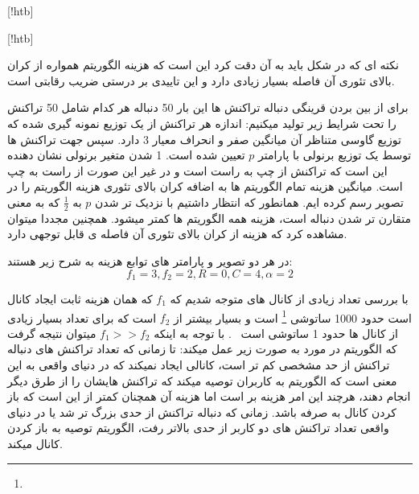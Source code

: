 [!htb]

[!htb]

نکته ای که در شکل   باید به آن دقت کرد این است که هزینه الگوریتم \on همواره از کران بالای تئوری آن فاصله بسیار زیادی دارد و این تاییدی بر درستی ضریب رقابتی است.

برای از بین بردن قرینگی دنباله تراکنش ها این بار 50 دنباله هر کدام شامل 50 تراکنش را تحت شرایط زیر تولید میکنیم: اندازه هر تراکنش از یک توزیع  نمونه گیری شده که توزیع گاوسی متناظر آن میانگین صفر و انحراف معیار 3 دارد. سپس جهت تراکنش ها توسط یک توزیع برنولی با پارامتر $p$ تعیین شده است. 1 شدن متغیر برنولی نشان دهنده این است که تراکنش از چپ به راست است و در غیر این صورت از راست به چپ است. میانگین هزینه تمام الگوریتم ها به اضافه کران بالای تئوری هزینه الگوریتم \on را در تصویر  رسم کرده ایم.
همانطور که انتظار داشتیم با نزدیک تر شدن $p$  به 
$\frac12$
که به معنی متقارن تر شدن دنباله است، هزینه همه الگوریتم ها کمتر میشود. همچنین مجددا میتوان مشاهده کرد که هزینه \on از کران بالای تئوری آن فاصله ی قابل توجهی دارد. 

در هر دو تصویر  و  پارامتر های توابع هزینه به شرح زیر هستند:
$$f_1 = 3 , f_2 = 2 , R = 0 , C = 4 , \alpha=2$$




با بررسی تعداد زیادی از کانال های   متوجه شدیم که 
$f_1$
که همان هزینه ثابت ایجاد کانال است حدود 1000 ساتوشی
\footnote{}
 است و بسیار بیشتر از 
$f_2$
است که برای تعداد بسیار زیادی از کانال ها حدود 1 ساتوشی است
~\cite{1ml,lngossip}.
با توجه به اینکه
$f_1 >> f_2$
میتوان نتیجه گرفت که الگوریتم \on در مورد   به صورت زیر عمل میکند:  تا زمانی که تعداد تراکنش های دنباله تراکنش از حد مشخصی کم تر است، \on کانالی ایجاد نمیکند که در دنیای واقعی به این معنی است که الگوریتم به کاربران توصیه میکند که تراکنش هایشان را از طرق دیگر انجام دهند، هرچند این امر هزینه بر است اما هزینه آن همچنان کمتر از این است که باز کردن کانال به صرفه باشد. زمانی که دنباله تراکنش از حدی بزرگ تر شد یا در دنیای واقعی تعداد تراکنش های دو کاربر از حدی بالاتر رفت، الگوریتم توصیه به باز کردن کانال میکند.

